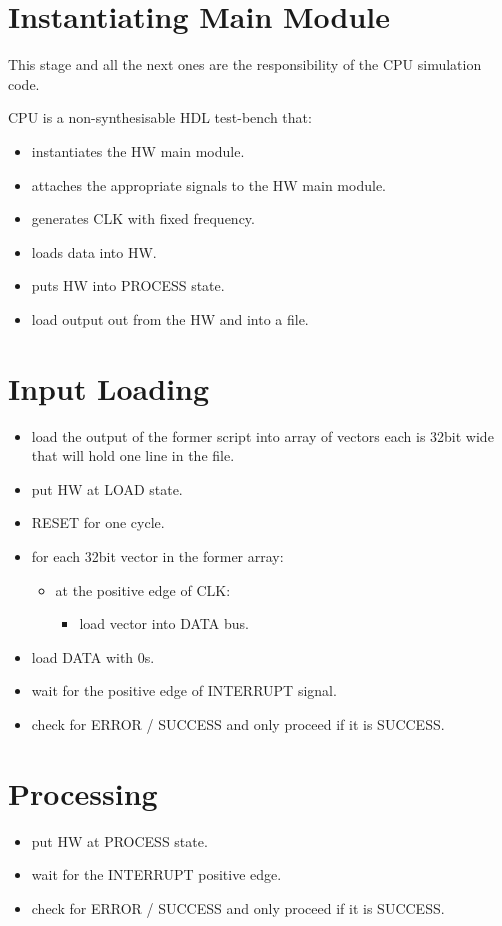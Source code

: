 \documentclass[12pt]{report}
\begin{document}
\section{Instantiating Main Module}
This stage and all the next ones are the responsibility of the CPU simulation code.

CPU is a non-synthesisable HDL test-bench that:
\begin{itemize}
    \item instantiates the HW main module.
    \item attaches the appropriate signals to the HW main module.
    \item generates CLK with fixed frequency.
    \item loads data into HW.
    \item puts HW into PROCESS state.
    \item load output out from the HW and into a file.
\end{itemize}

\section{Input Loading}
\begin{itemize}
    \item load the output of the former script into array of vectors each is 32bit wide that will hold one line in the file.
    \item put HW at LOAD state.
    \item RESET for one cycle.
    \item for each 32bit vector in the former array:
    \begin{itemize}
        \item at the positive edge of CLK:
        \begin{itemize}
            \item load vector into DATA bus.
        \end{itemize}
    \end{itemize}
    \item load DATA with 0s.
    \item wait for the positive edge of INTERRUPT signal.
    \item check for ERROR / SUCCESS and only proceed if it is SUCCESS.
\end{itemize}

\section{Processing}
\begin{itemize}
    \item put HW at PROCESS state.
    \item wait for the {INTERRUPT} positive edge.
    \item check for {ERROR / SUCCESS} and only proceed if it is SUCCESS.
\end{itemize}
\end{document}
